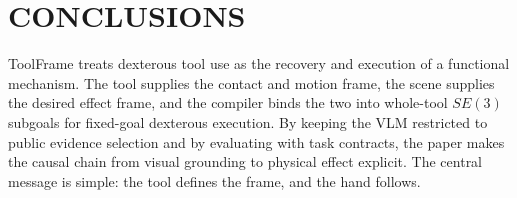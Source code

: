 \documentclass[letterpaper, 10 pt, conference]{ieeeconf}
\newcommand{\method}{ToolFrame}
\begin{document}
\section{CONCLUSIONS}

\method{} treats dexterous tool use as the recovery and execution of a
functional mechanism. The tool supplies the contact and motion frame, the scene
supplies the desired effect frame, and the compiler binds the two into
whole-tool $SE(3)$ subgoals for fixed-goal dexterous execution. By keeping the
VLM restricted to public evidence selection and by evaluating with task
contracts, the paper makes the causal chain from visual grounding to physical
effect explicit. The central message is simple: the tool defines the frame, and
the hand follows.



\end{document}
